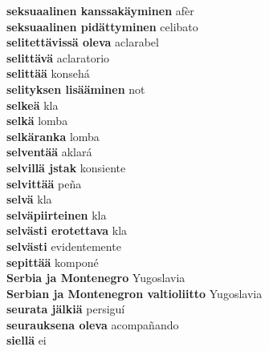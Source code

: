 \textbf{ seksuaalinen kanssakäyminen  } afèr \\
\textbf{ seksuaalinen pidättyminen  } celibato \\
\textbf{ selitettävissä oleva  } aclarabel \\
\textbf{ selittävä  } aclaratorio \\
\textbf{ selittää  } konsehá \\
\textbf{ selityksen lisääminen  } not \\
\textbf{ selkeä  } kla \\
\textbf{ selkä  } lomba \\
\textbf{ selkäranka  } lomba \\
\textbf{ selventää  } aklará \\
\textbf{ selvillä jstak  } konsiente \\
\textbf{ selvittää  } peña \\
\textbf{ selvä  } kla \\
\textbf{ selväpiirteinen  } kla \\
\textbf{ selvästi erotettava  } kla \\
\textbf{ selvästi  } evidentemente \\
\textbf{ sepittää  } komponé \\
\textbf{ Serbia ja Montenegro  } Yugoslavia \\
\textbf{ Serbian ja Montenegron valtioliitto  } Yugoslavia \\
\textbf{ seurata jälkiä  } persiguí \\
\textbf{ seurauksena oleva  } acompañando \\
\textbf{ siellä  } ei \\
